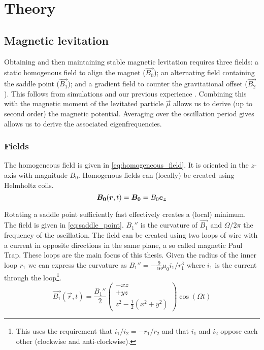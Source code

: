 \chapter{Theory}
\label{chap:theory}

\section{Magnetic levitation}
\label{sec:magnetic_levitation}
Obtaining and then maintaining stable magnetic levitation requires three fields: a static homogenous field to align the magnet ($\vec{B_0}$); an alternating field containing the saddle point ($\vec{B_1}$); and a gradient field to counter the gravitational offset ($\vec{B_2}$). This follows from simulations and our previous experience \cite{perdriat,mart,eli}. Combining this with the magnetic moment of the levitated particle $\vec{\mu}$ allows us to derive (up to second order) the magnetic potential. Averaging over the oscillation period gives allows us to derive the associated eigenfrequencies.

\subsection{Fields}
\label{subsec:fields}
The homogeneous field is given in \autoref{eq:homogeneous_field}. It is oriented in the $z$-axis with magnitude $B_0$. Homogenous fields can (locally) be created using Helmholtz coils.
\begin{equation}
    \bm{B_0}(\bm{r}, t) = \bm{B_0} = B_0 \bm{e_z}
    \label{eq:homogeneous_field}
\end{equation}

Rotating a saddle point sufficiently fast effectively creates a (local) minimum. The field is given in \autoref{eq:saddle_point}. $B_1''$ is the curvature of $\vec{B_1}$ and $\Omega / 2\pi$ the frequency of the oscillation. The field can be created using two loops of wire with a current in opposite directions in the same plane, a so called magnetic Paul Trap. These loops are the main focus of this thesis. Given the radius of the inner loop $r_1$ we can express the curvature as $B_1'' = -\frac{9}{16}\mu_0i_1/r_1^3$ where $i_1$ is the current through the loop\footnote{This uses the requirement that $i_1/i_2 = -r_1/r_2$ and that $i_1$ and $i_2$ oppose each other (clockwise and anti-clockwise).}.
\begin{equation}
    \vec{B_1}(\vec{r}, t) = \frac{B_1''}{2} \begin{pmatrix}
        -xz \\
        +yz \\
        z^2 - \frac{1}{2}\left(x^2 + y^2\right)
    \end{pmatrix} \cos(\Omega t)
    \label{eq:saddle_point}
\end{equation}

